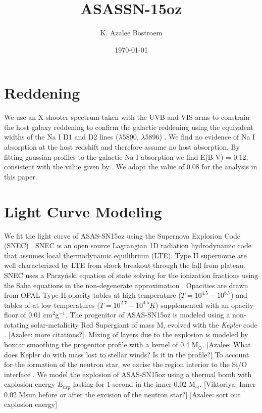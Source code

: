 \documentclass[preprint]{aastex61}   	%
\newcommand{\azaleecomment}[1]{{\color{red} [{#1}]}}
\newcommand{\Azalee}[1]{\azaleecomment{Azalee: #1}}
\newcommand{\viktoriyacomment}[1]{{\color{blue} [{#1}]}}
\newcommand{\Viktoriya}[1]{\viktoriyacomment{Viktoriya: #1}}
\newcommand{\msunperiod}{M$_{\odot}$}
\begin{document}
\title{ASASSN-15oz}
\author{K. Azalee Bostroem}

\date{\today}							%

\begin{abstract}
\end{abstract}

\section{Reddening}
We use an X-shooter spectrum taken with the UVB and VIS arms to constrain the host galaxy reddening to confirm the galactic reddening using the equivalent widths of the Na I D1 and D2 lines ($\lambda$5890, $\lambda$5896) \citep{2012poznanski}. 
We find no evidence of Na I absorption at the host redshift and therefore assume no host absorption. 
By fitting gaussian profiles to the galactic Na I absorption we find E(B-V) = 0.12, consistent with the value given by \citet{2011schlafly}. 
We adopt the \citet{2011schlafly}  value of 0.08 for the analysis in this paper. 

\section{Light Curve Modeling}
We fit the light curve of ASAS-SN15oz using the Supernova Explosion Code (SNEC) \citep{2015morozova}.
SNEC is an open source Lagrangian 1D radiation hydrodynamic code that assumes local thermodynamic equilibrium (LTE).
Type II supernovae are well characterized by LTE from shock breakout through the fall from plateau. 
SNEC uses a Paczy\'nski equation of state \citep{1983paczynski} solving for the ionization fractions using the Saha equations in the non-degenerate approximation \citep{2000zaghloul}. 
Opacities are drawn from OPAL Type II opacity tables \citep{1996iglesias} at high temperature ($T=10^{4.5}-10^{8.7}$) and tables of \citet{2005ferguson} at low temperatures ($T = 10^{2.7}-10^{4.5}K$) supplemented with an opacity floor of 0.01 cm$^2$g$^{-1}$. 
The progenitor of ASAS-SN15oz is modeled using a non-rotating solar-metalicity Red Supergiant of mass M, evolved with the {\it Kepler} code \citep{2016sukhbold}. 
\Azalee{more citations?}. 
Mixing of layers due to the explosion is modeled by boxcar smoothing the progenitor profile with a kernel of 0.4 \msunperiod.
\Azalee{What does Kepler do with mass lost to stellar winds? Is it in the profile?}
To account for the formation of the neutron star, we excise the region interior to the Si/O interface \citep{2018morozova}. 
We model the explosion of ASAS-SN15oz using a thermal bomb with explosion energy $E_{exp}$ lasting for 1 second in the inner 0.02 \msunperiod. 
\Viktoriya{Inner 0.02 Msun before or after the excision of the neutron star?}
\Azalee{sort out explosion energy}
\end{document}
